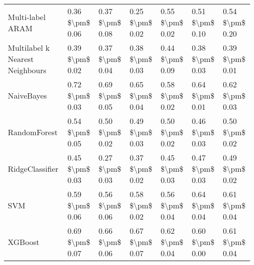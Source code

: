 \begin{tabular}{lllllll}
               Multi-label ARAM & 0.36 \$\textbackslash pm\$ 0.06 &           0.37 \$\textbackslash pm\$ 0.08 &       0.25 \$\textbackslash pm\$ 0.02 &        0.55 \$\textbackslash pm\$ 0.02 &                         0.51 \$\textbackslash pm\$ 0.10 & 0.54 \$\textbackslash pm\$ 0.20 \\
Multilabel k Nearest Neighbours & 0.39 \$\textbackslash pm\$ 0.02 &           0.37 \$\textbackslash pm\$ 0.04 &       0.38 \$\textbackslash pm\$ 0.03 &        0.44 \$\textbackslash pm\$ 0.09 &                         0.38 \$\textbackslash pm\$ 0.03 & 0.39 \$\textbackslash pm\$ 0.01 \\
                     NaiveBayes & 0.72 \$\textbackslash pm\$ 0.03 &           0.69 \$\textbackslash pm\$ 0.05 &       0.65 \$\textbackslash pm\$ 0.04 &        0.58 \$\textbackslash pm\$ 0.02 &                         0.64 \$\textbackslash pm\$ 0.01 & 0.62 \$\textbackslash pm\$ 0.03 \\
                   RandomForest & 0.54 \$\textbackslash pm\$ 0.05 &           0.50 \$\textbackslash pm\$ 0.02 &       0.49 \$\textbackslash pm\$ 0.03 &        0.50 \$\textbackslash pm\$ 0.02 &                         0.46 \$\textbackslash pm\$ 0.03 & 0.50 \$\textbackslash pm\$ 0.02 \\
                RidgeClassifier & 0.45 \$\textbackslash pm\$ 0.03 &           0.27 \$\textbackslash pm\$ 0.03 &       0.37 \$\textbackslash pm\$ 0.02 &        0.45 \$\textbackslash pm\$ 0.03 &                         0.47 \$\textbackslash pm\$ 0.03 & 0.49 \$\textbackslash pm\$ 0.02 \\
                            SVM & 0.59 \$\textbackslash pm\$ 0.06 &           0.56 \$\textbackslash pm\$ 0.06 &       0.58 \$\textbackslash pm\$ 0.02 &        0.56 \$\textbackslash pm\$ 0.04 &                         0.64 \$\textbackslash pm\$ 0.04 & 0.61 \$\textbackslash pm\$ 0.04 \\
                        XGBoost & 0.69 \$\textbackslash pm\$ 0.07 &           0.66 \$\textbackslash pm\$ 0.06 &       0.67 \$\textbackslash pm\$ 0.07 &        0.62 \$\textbackslash pm\$ 0.04 &                         0.60 \$\textbackslash pm\$ 0.00 & 0.61 \$\textbackslash pm\$ 0.04 \\
\bottomrule
\end{tabular}
